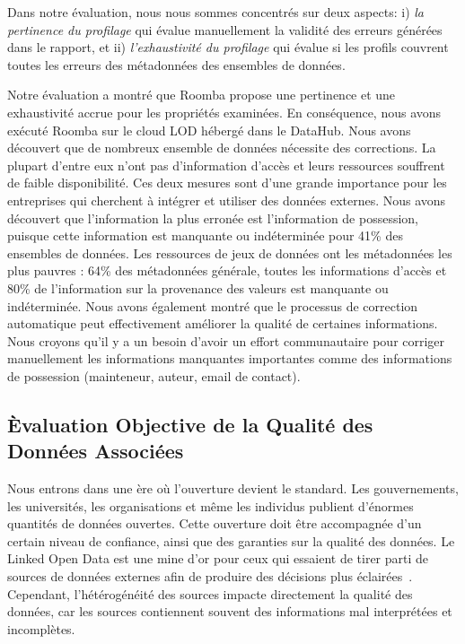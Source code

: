 Dans notre \'{e}valuation, nous nous sommes concentr\'{e}s sur deux aspects: i) \textit{la pertinence du profilage} qui \'{e}value manuellement la validit\'{e} des erreurs g\'{e}n\'{e}r\'{e}es dans le rapport, et ii) \textit{l'exhaustivit\'{e} du profilage} qui \'{e}value si les profils couvrent toutes les erreurs des m\'{e}tadonn\'{e}es des ensembles de donn\'{e}es.

Notre \'{e}valuation a montr\'{e} que Roomba propose une pertinence et une exhaustivit\'{e} accrue pour les propri\'{e}t\'{e}s examin\'{e}es. En cons\'{e}quence, nous avons ex\'{e}cut\'{e} Roomba sur le cloud LOD h\'{e}berg\'{e} dans le DataHub. Nous avons d\'{e}couvert que de nombreux ensemble de donn\'{e}es n\'{e}cessite des corrections. La plupart d'entre eux n'ont pas d'information d'acc\`{e}s et leurs ressources souffrent de faible disponibilit\'{e}. Ces deux mesures sont d'une grande importance pour les entreprises qui cherchent à int\'{e}grer et utiliser des donn\'{e}es externes. Nous avons d\'{e}couvert que l'information la plus erron\'{e}e est l'information de possession, puisque cette information est manquante ou ind\'{e}termin\'{e}e pour 41\% des ensembles de donn\'{e}es. Les ressources de jeux de donn\'{e}es ont les m\'{e}tadonn\'{e}es les plus pauvres : 64\% des m\'{e}tadonn\'{e}es g\'{e}n\'{e}rale, toutes les informations d'acc\`{e}s et 80\% de l'information sur la provenance des valeurs est manquante ou ind\'{e}termin\'{e}e. Nous avons \'{e}galement montr\'{e} que le processus de correction automatique peut effectivement am\'{e}liorer la qualit\'{e} de certaines informations. Nous croyons qu'il y a un besoin d'avoir un effort communautaire pour corriger manuellement les informations manquantes importantes comme des informations de possession (mainteneur, auteur, email de contact).

\subsection{\`{E}valuation Objective de la Qualit\'{e} des Donn\'{e}es Associ\'{e}es}

Nous entrons dans une \`{e}re où l'ouverture devient le standard. Les gouvernements, les universit\'{e}s, les organisations et même les individus publient d'\'{e}normes quantit\'{e}s de donn\'{e}es ouvertes. Cette ouverture doit être accompagn\'{e}e d'un certain niveau de confiance, ainsi que des garanties sur la qualit\'{e} des donn\'{e}es. Le Linked Open Data est une mine d'or pour ceux qui essaient de tirer parti de sources de donn\'{e}es externes afin de produire des d\'{e}cisions plus \'{e}clair\'{e}es~\cite{Boyd:Article:11}. Cependant, l'h\'{e}t\'{e}rog\'{e}n\'{e}it\'{e} des sources impacte directement la qualit\'{e} des donn\'{e}es, car les sources contiennent souvent des informations mal interpr\'{e}t\'{e}es et incompl\`{e}tes.

